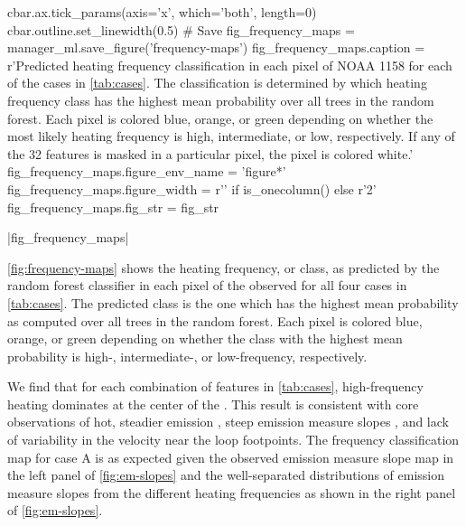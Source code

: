 \begin{pycode}[manager_ml]
cbar.ax.tick_params(axis='x', which='both', length=0)
cbar.outline.set_linewidth(0.5)
# Save
fig_frequency_maps = manager_ml.save_figure('frequency-maps')
fig_frequency_maps.caption = r'Predicted heating frequency classification in each pixel of NOAA 1158 for each of the cases in \autoref{tab:cases}. The classification is determined by which heating frequency class has the highest mean probability over all trees in the random forest. Each pixel is colored blue, orange, or green depending on whether the most likely heating frequency is high, intermediate, or low, respectively. If any of the 32 features is masked in a particular pixel, the pixel is colored white.'
fig_frequency_maps.figure_env_name = 'figure*'
fig_frequency_maps.figure_width = r'\columnwidth' if is_onecolumn() else r'2\columnwidth'
fig_frequency_maps.fig_str = fig_str
\end{pycode}
\py[manager_ml]|fig_frequency_maps|

\autoref{fig:frequency-maps} shows the heating frequency, or class, as predicted by the random forest classifier in each pixel of the observed \AR{} for all four cases in \autoref{tab:cases}.
The predicted class is the one which has the highest mean probability as computed over all trees in the random forest.
Each pixel is colored blue, orange, or green depending on whether the class with the highest mean probability is high-, intermediate-, or low-frequency, respectively.

We find that for each combination of features in \autoref{tab:cases}, high-frequency heating dominates at the center of the \AR{}.
This result is consistent with \AR{} core observations of hot, steadier emission \citep{warren_evidence_2010,warren_constraints_2011}, steep emission measure slopes \citep[e.g.][]{winebarger_using_2011,del_zanna_evolution_2015}, and lack of variability in the velocity \citep{brooks_flows_2009} near the loop footpoints.
The frequency classification map for case A is as expected given the observed emission measure slope map in the left panel of \autoref{fig:em-slopes} and the well-separated distributions of emission measure slopes from the different heating frequencies as shown in the right panel of \autoref{fig:em-slopes}.

